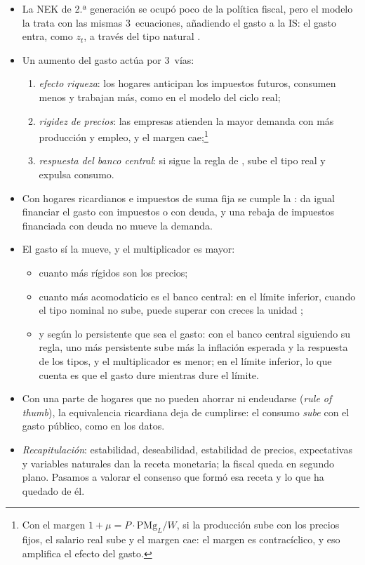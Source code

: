 \documentclass[11pt]{article}
\begin{document}
\begin{itemize}
\item La NEK de 2.ª generación se ocupó poco de la política fiscal, pero el modelo la trata con las mismas 3~ecuaciones, añadiendo el gasto a la IS: el gasto entra, como $z_t$, a través del tipo natural .
\item Un aumento del gasto actúa por 3~vías:
  \begin{enumerate}
  \item \emph{efecto riqueza}: los hogares anticipan los impuestos futuros, consumen menos y trabajan más, como en el modelo del ciclo real;
  \item \emph{rigidez de precios}: las empresas atienden la mayor demanda con más producción y empleo, y el margen cae;\footnote{Con el margen $1+\mu=P\cdot\mathrm{PMg}_L/W$, si la producción sube con los precios fijos, el salario real sube y el margen cae: el margen es contracíclico, y eso amplifica el efecto del gasto.}
  \item \emph{respuesta del banco central}: si sigue la regla de , sube el tipo real y expulsa consumo.
  \end{enumerate}
\item Con hogares ricardianos e impuestos de suma fija se cumple la \nocite{Barro1974} : da igual financiar el gasto con impuestos o con deuda, y una rebaja de impuestos financiada con deuda no mueve la demanda.
\item El gasto sí la mueve, y el multiplicador es mayor:
  \begin{itemize}
  \item cuanto más rígidos son los precios;
  \item cuanto más acomodaticio es el banco central: en el límite inferior, cuando el tipo nominal no sube, puede superar con creces la unidad\nocite{Woodford2011Simple,ChristianoEichenbaumRebelo2011} ;
  \item y según lo persistente que sea el gasto: con el banco central siguiendo su regla, uno más persistente sube más la inflación esperada y la respuesta de los tipos, y el multiplicador es menor; en el límite inferior, lo que cuenta es que el gasto dure mientras dure el límite\nocite{Woodford2011Simple}.
  \end{itemize}
\item Con una parte de hogares que no pueden ahorrar ni endeudarse (\emph{rule of thumb}), la equivalencia ricardiana deja de cumplirse: el consumo \emph{sube} con el gasto público, como en los datos\nocite{GaliLopezSalidoValles2007}.
\item \emph{Recapitulación}: estabilidad, deseabilidad, estabilidad de precios, expectativas y variables naturales dan la receta monetaria; la fiscal queda en segundo plano. Pasamos a valorar el consenso que formó esa receta y lo que ha quedado de él.
\end{itemize}
\end{document}
